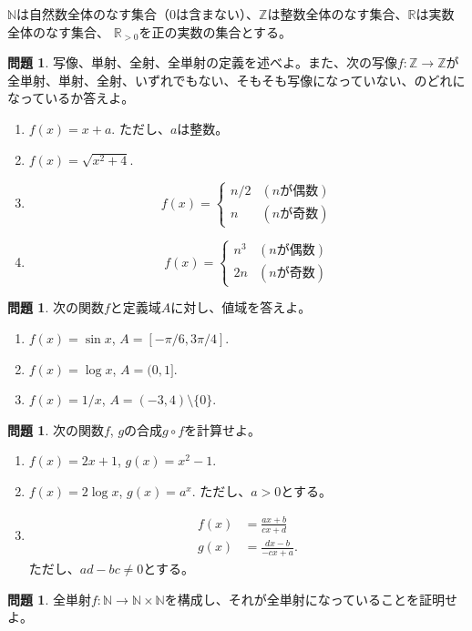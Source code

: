 \documentclass[uplatex]{jsarticle}
\theoremstyle{definition}
\numberwithin{equation}{section}
\newtheorem{prob}[section]{問題}
\newcommand{\R}{\mathbb{R}}
\newcommand{\Z}{\mathbb{Z}}
\newcommand{\N}{\mathbb{N}}
\begin{document}
$\N$は自然数全体のなす集合（0は含まない）、$\Z$は整数全体のなす集合、$\R$は実数全体のなす集合、
$\R_{>0}$を正の実数の集合とする。
\begin{prob}
  写像、単射、全射、全単射の定義を述べよ。また、次の写像$f:\Z\to\Z$が全単射、単射、全射、いずれでもない、そもそも写像になっていない、のどれになっているか答えよ。
  \begin{enumerate}
    \item $f(x)=x+a$. ただし、$a$は整数。
    \item $f(x)=\sqrt{x^2+4}$.
    \item
      \[
        f(x)=\begin{cases}
          n/2 & (n\text{が偶数}) \\
          n & (n\text{が奇数})
        \end{cases}
      \]
    \item
      \[
        f(x)=\begin{cases}
          n^3 & (n\text{が偶数}) \\
          2n & (n\text{が奇数})
        \end{cases}
      \]
  \end{enumerate}
\end{prob}

\begin{prob}
  次の関数$f$と定義域$A$に対し、値域を答えよ。
  \begin{enumerate}
    \item $f(x)=\sin x$, $A=[-\pi/6, 3\pi/4]$.
    \item $f(x)=\log x$, $A=(0, 1]$.
    \item $f(x)=1/x$, $A=(-3,4)\setminus{\{0\}}$.
  \end{enumerate}
\end{prob}

\begin{prob}
  次の関数$f$, $g$の合成$g\circ f$を計算せよ。
  \begin{enumerate}
    \item $f(x)=2x+1$, $g(x)=x^2-1$.
    \item $f(x)=2\log x$, $g(x)=a^x$. ただし、$a>0$とする。
    \item
      \begin{align*}
        f(x)&=\frac{ax+b}{cx+d}\\
        g(x)&=\frac{dx-b}{-cx+a}.
      \end{align*}
      ただし、$ad-bc \not= 0$とする。
  \end{enumerate}

\end{prob}

\begin{prob}
  全単射$f:\N\to\N\times\N$を構成し、それが全単射になっていることを証明せよ。
\end{prob}
\end{document}
